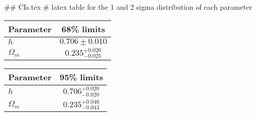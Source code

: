 ## CIs.tex
# latex table for the 1 and 2 sigma distribution of each parameter

\begin{tabular} { l  c}
 Parameter &  68\% limits\\
\hline
{\boldmath$h              $} & $0.706\pm 0.010            $\\
{\boldmath$\Omega_m       $} & $0.235^{+0.020}_{-0.025}   $\\
\hline
\end{tabular}

\begin{tabular} { l  c}
 Parameter &  95\% limits\\
\hline
{\boldmath$h              $} & $0.706^{+0.020}_{-0.020}   $\\
{\boldmath$\Omega_m       $} & $0.235^{+0.046}_{-0.043}   $\\
\hline
\end{tabular}
